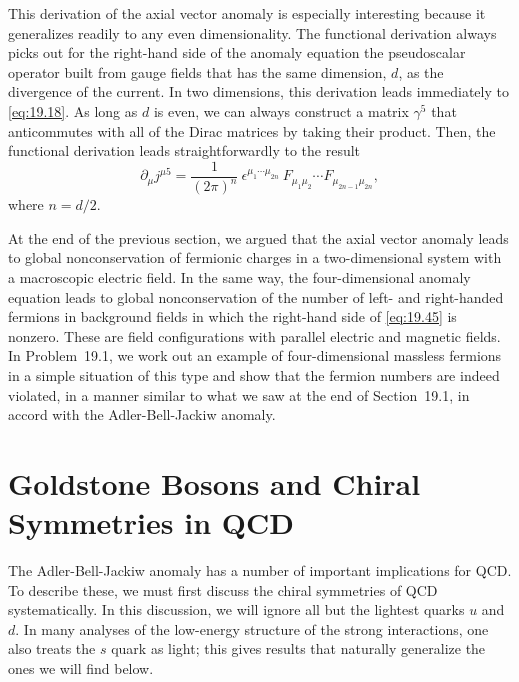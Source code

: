 This derivation of the axial vector anomaly is especially interesting because
it generalizes readily to any even dimensionality.  The functional derivation
always picks out for the right-hand side of the anomaly equation the
pseudoscalar operator built from gauge fields that has the same dimension,
$d$, as the divergence of the current.  In two dimensions, this derivation
leads immediately to \eqref{eq:19.18}.  As long as $d$ is even, we can always
construct a matrix $\gamma^5$ that anticommutes with all of the Dirac
matrices by taking their product.  Then, the functional derivation leads
straightforwardly to the result
\begin{equation}
  \partial_\mu j^{\mu 5} = \frac{1}{(2\pi)^n}\ \epsilon^{\mu_1\cdots\mu_{2n}}\
    F_{\mu_1\mu_2}\cdots F_{\mu_{2n-1}\mu_{2n}} ,
  \label{eq:19.80}
\end{equation}
where $n = d/2$.

At the end of the previous section, we argued that the axial vector anomaly
leads to global nonconservation of fermionic charges in a two-dimensional
system with a macroscopic electric field.  In the same way, the four-dimensional
anomaly equation leads to global nonconservation of the number of left- and
right-handed fermions in background fields in which the right-hand side of
\eqref{eq:19.45} is nonzero.  These are field configurations with parallel
electric and magnetic fields.  In Problem~19.1, we work out an example of
four-dimensional massless fermions in a simple situation of this type and
show that the fermion numbers are indeed violated, in a manner similar to
what we saw at the end of Section~19.1, in accord with the Adler-Bell-Jackiw
anomaly.

\section{Goldstone Bosons and Chiral Symmetries in QCD}

The Adler-Bell-Jackiw anomaly has a number of important implications for QCD.
To describe these, we must first discuss the chiral symmetries of QCD
systematically.  In this discussion, we will ignore all but the lightest
quarks $u$ and $d$.  In many analyses of the low-energy structure of the
strong interactions, one also treats the $s$ quark as light; this gives
results that naturally generalize the ones we will find below.

